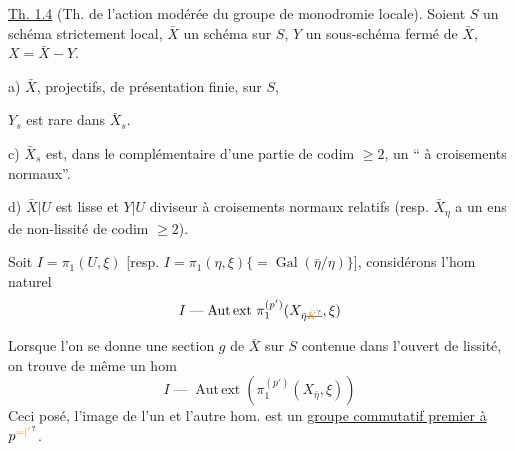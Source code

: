 \uline{Th. 1.4} (Th. de l'action modérée du groupe de monodromie locale). Soient $S$ un schéma strictement local, $\bar X$ un schéma sur $S$, $Y$ un sous-schéma fermé de $\bar X$, $X=\bar X-Y$.

a) $\bar X$,   projectifs, de présentation finie,  sur $S$, 

 $Y_s$ est rare dans $\bar X_s$.

c) $\bar X_s$ est, dans le complémentaire d'une partie de codim $\geq2$, un `` à croisements normaux''.
  


d) $\bar X|U$ est lisse et $Y|U$ diviseur à croisements normaux relatifs (resp. $\bar X_\eta$ a un ens de non-lissité de codim $\geq2$).

Soit $I=\pi_1(U,\xi)$ [resp. $I=\pi_1(\eta,\xi)\{=\operatorname{Gal}(\bar\eta/\eta)\}$], considérons l'hom naturel
\[
I\mathrel{\text{---}}\operatorname{Aut\,ext}\,\pi_1^{(p')}(X_{\bar\eta\deleted{\unsure{\bar K}}},\xi)
\]

Lorsque l'on se donne une section $g$ de $\bar X$ sur $S$ contenue dans l'ouvert de lissité, on trouve de même un hom
\[
I\mathrel{\text{---}}\operatorname{Aut\,ext}(\pi_1^{(p')}(X_{\bar\eta},\xi))
\]
Ceci posé, l'image de l'un et l'autre hom. est un \uline{groupe  commutatif premier à $p^{\unsure{=|'}}$}.

